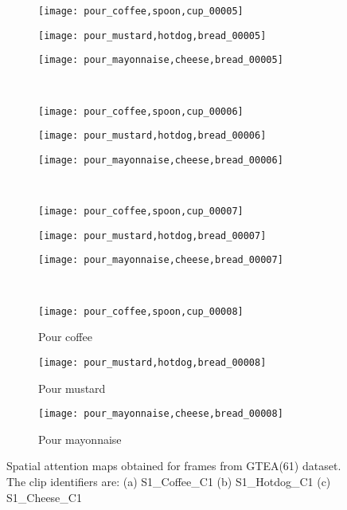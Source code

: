 \documentclass{bmvc2k}
\begin{document}
\begin{figure}[h]
	\vskip 2mm
	\begin{subfigure}[b]{0.32\textwidth}
		\texttt{[image: pour\_coffee,spoon,cup\_00005]}
	\end{subfigure}
	\begin{subfigure}[b]{0.32\textwidth}
		\texttt{[image: pour\_mustard,hotdog,bread\_00005]}
	\end{subfigure}
	\begin{subfigure}[b]{0.32\textwidth}
		\texttt{[image: pour\_mayonnaise,cheese,bread\_00005]}
	\end{subfigure}\\
	\vskip 2mm
	\begin{subfigure}[b]{0.32\textwidth}
		\texttt{[image: pour\_coffee,spoon,cup\_00006]}
	\end{subfigure}
	\begin{subfigure}[b]{0.32\textwidth}
		\texttt{[image: pour\_mustard,hotdog,bread\_00006]}
	\end{subfigure}
	\begin{subfigure}[b]{0.32\textwidth}
		\texttt{[image: pour\_mayonnaise,cheese,bread\_00006]}
	\end{subfigure}\\
	\vskip 2mm
	\begin{subfigure}[b]{0.32\textwidth}
		\texttt{[image: pour\_coffee,spoon,cup\_00007]}
	\end{subfigure}
	\begin{subfigure}[b]{0.32\textwidth}
		\texttt{[image: pour\_mustard,hotdog,bread\_00007]}
	\end{subfigure}
	\begin{subfigure}[b]{0.32\textwidth}
		\texttt{[image: pour\_mayonnaise,cheese,bread\_00007]}
	\end{subfigure}\\
	\vskip 2mm
	\begin{subfigure}[b]{0.32\textwidth}
		\texttt{[image: pour\_coffee,spoon,cup\_00008]}
		\caption{Pour coffee}
	\end{subfigure}
	\begin{subfigure}[b]{0.32\textwidth}
		\texttt{[image: pour\_mustard,hotdog,bread\_00008]}
		\caption{Pour mustard}
	\end{subfigure}
	\begin{subfigure}[b]{0.32\textwidth}
		\texttt{[image: pour\_mayonnaise,cheese,bread\_00008]}
		\caption{Pour mayonnaise}
	\end{subfigure}
			\vspace*{2mm}
	\caption{Spatial attention maps obtained for frames from GTEA(61) dataset. The clip identifiers are: (a) S1\_Coffee\_C1 (b) S1\_Hotdog\_C1 (c) S1\_Cheese\_C1}
	\label{fig:fig_ex2}
\end{figure}
\end{document}

